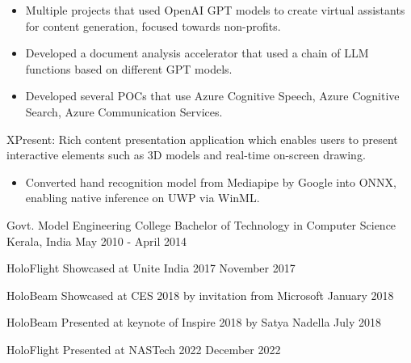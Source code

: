 \documentclass[11pt, a4paper]{awesome-cv}
\begin{document}
\begin{cventries}
{\begin{cvitems}
				\begin{itemize} 
					\item Multiple projects that used OpenAI GPT models to create virtual assistants for content generation, focused towards non-profits.
					\item Developed a document analysis accelerator that used a chain of LLM functions based on different GPT models.
					\item Developed several POCs that use Azure Cognitive Speech, Azure Cognitive Search, Azure Communication Services.
				\end{itemize}
\vspace{1mm}
			\item XPresent: Rich content presentation application which enables users to present interactive elements such as 3D models and real-time on-screen drawing.
				\begin{itemize} 
					\item Converted hand recognition model from Mediapipe by Google into ONNX, enabling native inference on UWP via WinML.
				\end{itemize}
		\end{cvitems}
	}
\end{cventries}

\vspace{-1mm}
\begin{cventries}
	\cventry
	{Govt. Model Engineering College} %
	{Bachelor of Technology in Computer Science} %
	{Kerala, India} %
	{May 2010 - April 2014} %
	{
	}
\end{cventries}


\vspace{-6mm}
\begin{cvhonors}
	\cvrecognition
		{HoloFlight} %
		{Showcased at Unite India 2017} %
		{November 2017} %
		{}
		
	\cvrecognition
		{HoloBeam} %
		{Showcased at CES 2018 by invitation from Microsoft} %
		{January 2018} %
		{}
		
	\cvrecognition
		{HoloBeam} %
		{Presented at keynote of Inspire 2018 by Satya Nadella} %
		{July 2018} %
		{}

	\cvrecognition
		{HoloFlight} %
		{Presented at NASTech 2022} %
		{December 2022} %
		{}
\end{cvhonors}
\end{document}
